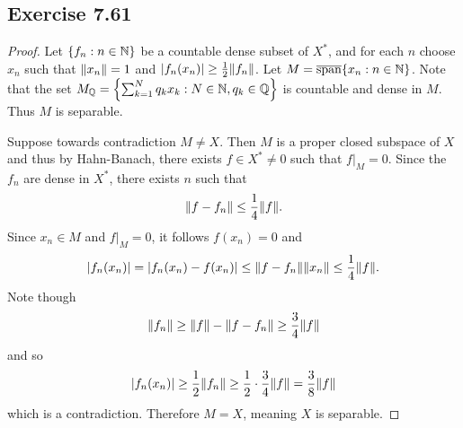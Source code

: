 \documentclass[hw_all.tex]{subfiles}
\begin{document}
\subsection{Exercise 7.61}
\begin{proof}
    Let $\qty{f_n : n \in \mathbb{N}}$ be a countable dense subset of $X^*$, and for each $n$ choose $x_n$ such that $\norm{x_n} = 1$ and $|f_n(x_n)| \geq \frac{1}{2} \norm{f_n}$. Let $M = \overline{\operatorname{span}}\qty{x_n : n \in \mathbb{N}}$. Note that the set $M_{\mathbb{Q}} = \qty{\sum_{k = 1}^N q_k x_k : N \in \mathbb{N}, q_k \in \mathbb{Q}}$ is countable and dense in $M$. Thus $M$ is separable.

    Suppose towards contradiction $M \neq X$. Then $M$ is a proper closed subspace of $X$ and thus by Hahn-Banach, there exists $f \in X^* \neq 0$ such that $f\vert_M = 0$. Since the $f_n$ are dense in $X^*$, there exists $n$ such that 
    \[
        \norm{f - f_n} \leq \frac{1}{4} \norm{f}
    .\]
    Since $x_n \in M$ and $f|_M = 0$, it follows $f(x_n) = 0$ and
    \[
        |f_n(x_n)| = |f_n(x_n) - f(x_n)| \leq \norm{f - f_n}\norm{x_n} \leq \frac{1}{4} \norm{f}
    .\]
    Note though
    \[
        \norm{f_n} \geq \norm{f} - \norm{f - f_n} \geq \frac{3}{4} \norm{f}
    \]
    and so
    \[
        |f_n(x_n)| \geq \frac{1}{2} \norm{f_n} \geq \frac{1}{2} \cdot \frac{3}{4} \norm{f} = \frac{3}{8} \norm{f}
    \]
    which is a contradiction. Therefore $M = X$, meaning $X$ is separable.
\end{proof}
\end{document}

